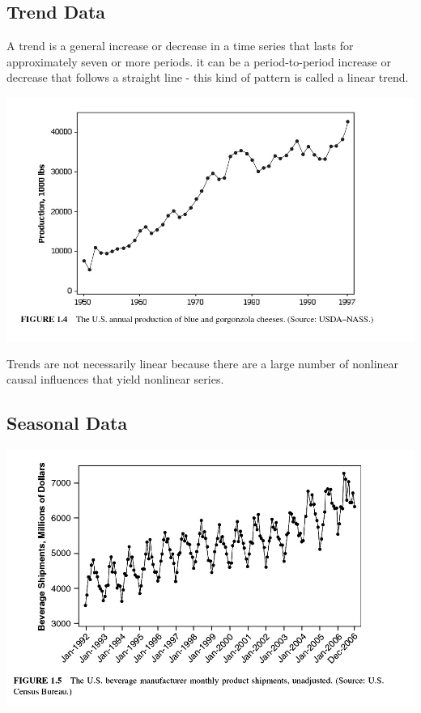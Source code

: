 \documentclass[
]{book}
\begin{document}
\hypertarget{trend-data}{%
\subsection{Trend Data}\label{trend-data}}

A trend is a general increase or decrease in a time series that lasts for approximately seven or more periods. it can be a period-to-period increase or decrease that follows a straight line - this kind of pattern is called a linear trend.

\begin{center}\includegraphics[width=0.8\linewidth]{img11/w11-Figure04} \end{center}

Trends are not necessarily linear because there are a large number of nonlinear causal influences that yield nonlinear series.

\hypertarget{seasonal-data}{%
\subsection{Seasonal Data}\label{seasonal-data}}

\begin{center}\includegraphics[width=0.8\linewidth]{img11/w11-Figure05} \end{center}
\end{document}
